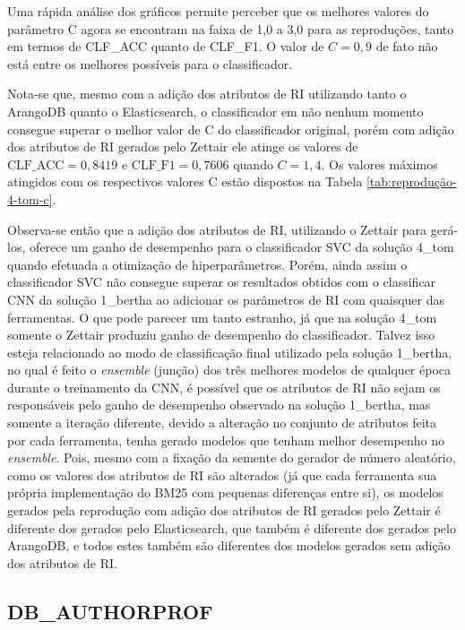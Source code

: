 			

			
			
			Uma rápida análise dos gráficos permite perceber que os melhores valores do parâmetro C agora se encontram na faixa de 1,0 a 3,0 para as reproduções, tanto em termos de CLF\_ACC quanto de CLF\_F1.
			O valor de $C = 0,9$ de fato não está entre os melhores possíveis para o classificador.
			
			Nota-se que, mesmo com a adição dos atributos de RI utilizando tanto o ArangoDB quanto o Elasticsearch, o classificador em não nenhum momento consegue superar o melhor valor de C do classificador original, porém com adição dos atributos de RI gerados pelo Zettair ele atinge os valores de $\text{CLF\_ACC} = 0,8419$ e $\text{CLF\_F1} = 0,7606$ quando $C = 1,4$.
			Os valores máximos atingidos com os respectivos valores C estão dispostos na Tabela \ref{tab:reprodução-4-tom-c}.

			

			Observa-se então que a adição dos atributos de RI, utilizando o Zettair para gerá-los, oferece um ganho de desempenho para o classificador SVC da solução 4\_tom quando efetuada a otimização de hiperparâmetros.
			Porém, ainda assim o classificador SVC não consegue superar os resultados obtidos com o classificar CNN da solução 1\_bertha ao adicionar os parâmetros de RI com quaisquer das ferramentas.
			O que pode parecer um tanto estranho, já que na solução 4\_tom somente o Zettair produziu ganho de desempenho do classificador.
			Talvez isso esteja relacionado ao modo de classificação final utilizado pela solução 1\_bertha, no qual é feito o \textit{ensemble} (junção) dos três melhores modelos de qualquer época durante o treinamento da CNN, é possível que os atributos de RI não sejam os responsáveis pelo ganho de desempenho observado na solução 1\_bertha, mas somente a iteração diferente, devido a alteração no conjunto de atributos feita por cada ferramenta, tenha gerado modelos que tenham melhor desempenho no \textit{ensemble}.
			Pois, mesmo com a fixação da semente do gerador de número aleatório, como os valores dos atributos de RI são alterados (já que cada ferramenta sua própria implementação do BM25 com pequenas diferenças entre si), os modelos gerados pela reprodução com adição dos atributos de RI gerados pelo Zettair é diferente dos gerados pelo Elasticsearch, que também é diferente dos gerados pelo ArangoDB, e todos estes também são diferentes dos modelos gerados sem adição dos atributos de RI.


		\subsection{DB\_AUTHORPROF}





